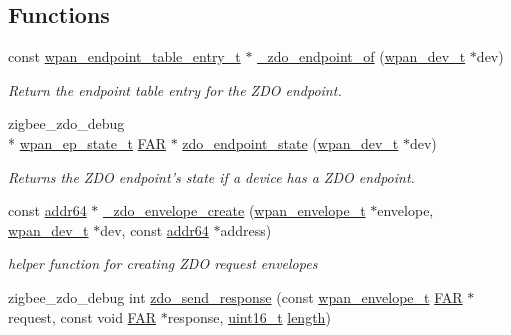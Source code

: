 \subsection*{Functions}
\begin{DoxyCompactItemize}
\item 
const \hyperlink{structwpan__endpoint__table__entry__t}{wpan\-\_\-endpoint\-\_\-table\-\_\-entry\-\_\-t} $\ast$ \hyperlink{group__zdo_gab405baf051b6c2b3c85bc4e80aa5c2bb}{\-\_\-zdo\-\_\-endpoint\-\_\-of} (\hyperlink{structwpan__dev__t}{wpan\-\_\-dev\-\_\-t} $\ast$dev)
\begin{DoxyCompactList}\small\item\em Return the endpoint table entry for the Z\-D\-O endpoint. \end{DoxyCompactList}\item 
zigbee\-\_\-zdo\-\_\-debug \\*
\hyperlink{structwpan__ep__state__t}{wpan\-\_\-ep\-\_\-state\-\_\-t} \hyperlink{group__hal_gaef060b3456fdcc093a7210a762d5f2ed}{F\-A\-R} $\ast$ \hyperlink{group__zdo_gaaf992619b06595291c2aead8a3d4dba1}{zdo\-\_\-endpoint\-\_\-state} (\hyperlink{structwpan__dev__t}{wpan\-\_\-dev\-\_\-t} $\ast$dev)
\begin{DoxyCompactList}\small\item\em Returns the Z\-D\-O endpoint's state if a device has a Z\-D\-O endpoint. \end{DoxyCompactList}\item 
const \hyperlink{unionaddr64}{addr64} $\ast$ \hyperlink{group__zdo_gae4b6736d215caf2a10790761ed52443d}{\-\_\-zdo\-\_\-envelope\-\_\-create} (\hyperlink{structwpan__envelope__t}{wpan\-\_\-envelope\-\_\-t} $\ast$envelope, \hyperlink{structwpan__dev__t}{wpan\-\_\-dev\-\_\-t} $\ast$dev, const \hyperlink{unionaddr64}{addr64} $\ast$address)
\begin{DoxyCompactList}\small\item\em helper function for creating Z\-D\-O request envelopes \end{DoxyCompactList}\item 
zigbee\-\_\-zdo\-\_\-debug int \hyperlink{group__zdo_ga1d645805a731e1419b5012a5c8a09bf8}{zdo\-\_\-send\-\_\-response} (const \hyperlink{structwpan__envelope__t}{wpan\-\_\-envelope\-\_\-t} \hyperlink{group__hal_gaef060b3456fdcc093a7210a762d5f2ed}{F\-A\-R} $\ast$request, const void \hyperlink{group__hal_gaef060b3456fdcc093a7210a762d5f2ed}{F\-A\-R} $\ast$response, \hyperlink{group__hal_ga5a8b2dc9e45a9ee81a94ef304fb62505}{uint16\-\_\-t} \hyperlink{group__zdo_gab2b3adeb2a67e656ff030b56727fd0ac}{length})

\end{DoxyCompactItemize}
